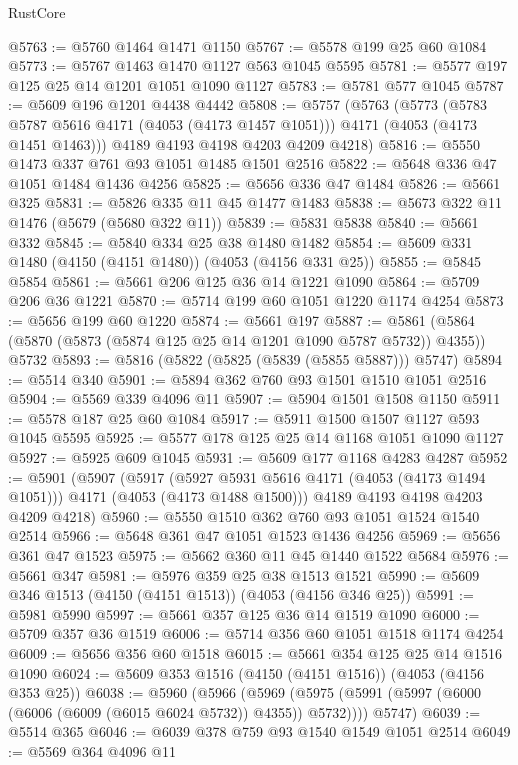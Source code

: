 \begin{lexlean}{RustCore}
\begin{coremodule}
@5763 := @5760 @1464 @1471 @1150
@5767 := @5578 @199 @25 @60 @1084
@5773 := @5767 @1463 @1470 @1127 @563 @1045 @5595
@5781 := @5577 @197 @125 @25 @14 @1201 @1051 @1090 @1127
@5783 := @5781 @577 @1045
@5787 := @5609 @196 @1201 @4438 @4442
@5808 := @5757
    (@5763
      (@5773
        (@5783 @5787 @5616 @4171 (@4053 (@4173 @1457 @1051)))
        @4171
        (@4053 (@4173 @1451 @1463)))
      @4189
      @4193
      @4198
      @4203
      @4209
      @4218)
@5816 := @5550 @1473 @337 @761 @93 @1051 @1485 @1501 @2516
@5822 := @5648 @336 @47 @1051 @1484 @1436 @4256
@5825 := @5656 @336 @47 @1484
@5826 := @5661 @325
@5831 := @5826 @335 @11 @45 @1477 @1483
@5838 := @5673 @322 @11 @1476 (@5679 (@5680 @322 @11))
@5839 := @5831 @5838
@5840 := @5661 @332
@5845 := @5840 @334 @25 @38 @1480 @1482
@5854 := @5609 @331 @1480 (@4150 (@4151 @1480)) (@4053 (@4156 @331 @25))
@5855 := @5845 @5854
@5861 := @5661 @206 @125 @36 @14 @1221 @1090
@5864 := @5709 @206 @36 @1221
@5870 := @5714 @199 @60 @1051 @1220 @1174 @4254
@5873 := @5656 @199 @60 @1220
@5874 := @5661 @197
@5887 := @5861 (@5864 (@5870 (@5873 (@5874 @125 @25 @14 @1201 @1090 @5787 @5732)) @4355)) @5732
@5893 := @5816 (@5822 (@5825 (@5839 (@5855 @5887))) @5747)
@5894 := @5514 @340
@5901 := @5894 @362 @760 @93 @1501 @1510 @1051 @2516
@5904 := @5569 @339 @4096 @11
@5907 := @5904 @1501 @1508 @1150
@5911 := @5578 @187 @25 @60 @1084
@5917 := @5911 @1500 @1507 @1127 @593 @1045 @5595
@5925 := @5577 @178 @125 @25 @14 @1168 @1051 @1090 @1127
@5927 := @5925 @609 @1045
@5931 := @5609 @177 @1168 @4283 @4287
@5952 := @5901
    (@5907
      (@5917
        (@5927 @5931 @5616 @4171 (@4053 (@4173 @1494 @1051)))
        @4171
        (@4053 (@4173 @1488 @1500)))
      @4189
      @4193
      @4198
      @4203
      @4209
      @4218)
@5960 := @5550 @1510 @362 @760 @93 @1051 @1524 @1540 @2514
@5966 := @5648 @361 @47 @1051 @1523 @1436 @4256
@5969 := @5656 @361 @47 @1523
@5975 := @5662 @360 @11 @45 @1440 @1522 @5684
@5976 := @5661 @347
@5981 := @5976 @359 @25 @38 @1513 @1521
@5990 := @5609 @346 @1513 (@4150 (@4151 @1513)) (@4053 (@4156 @346 @25))
@5991 := @5981 @5990
@5997 := @5661 @357 @125 @36 @14 @1519 @1090
@6000 := @5709 @357 @36 @1519
@6006 := @5714 @356 @60 @1051 @1518 @1174 @4254
@6009 := @5656 @356 @60 @1518
@6015 := @5661 @354 @125 @25 @14 @1516 @1090
@6024 := @5609 @353 @1516 (@4150 (@4151 @1516)) (@4053 (@4156 @353 @25))
@6038 := @5960
    (@5966
      (@5969 (@5975 (@5991 (@5997 (@6000 (@6006 (@6009 (@6015 @6024 @5732)) @4355)) @5732))))
      @5747)
@6039 := @5514 @365
@6046 := @6039 @378 @759 @93 @1540 @1549 @1051 @2514
@6049 := @5569 @364 @4096 @11

\end{coremodule}
\end{lexlean}
